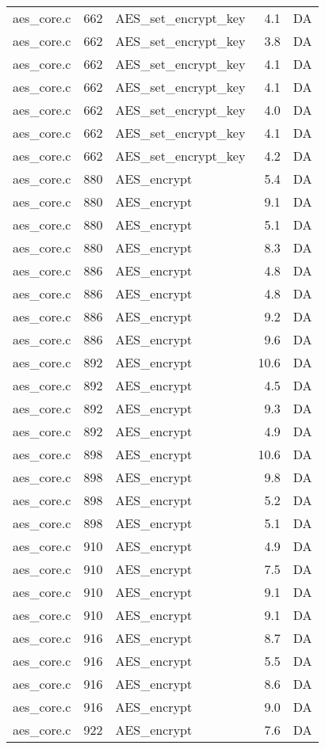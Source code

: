 \begin{table}[h!]
\begin{tabular}{lrlrr}
aes\_core.c& 662&AES\_set\_encrypt\_key&4.1 &DA\\
aes\_core.c& 662&AES\_set\_encrypt\_key&3.8 &DA\\
aes\_core.c& 662&AES\_set\_encrypt\_key&4.1 &DA\\
aes\_core.c& 662&AES\_set\_encrypt\_key&4.1 &DA\\
aes\_core.c& 662&AES\_set\_encrypt\_key&4.0 &DA\\
aes\_core.c& 662&AES\_set\_encrypt\_key&4.1 &DA\\
aes\_core.c& 662&AES\_set\_encrypt\_key&4.2 &DA\\
aes\_core.c& 880&AES\_encrypt&5.4 &DA\\
aes\_core.c& 880&AES\_encrypt&9.1 &DA\\
aes\_core.c& 880&AES\_encrypt&5.1 &DA\\
aes\_core.c& 880&AES\_encrypt&8.3 &DA\\
aes\_core.c& 886&AES\_encrypt&4.8 &DA\\
aes\_core.c& 886&AES\_encrypt&4.8 &DA\\
aes\_core.c& 886&AES\_encrypt&9.2 &DA\\
aes\_core.c& 886&AES\_encrypt&9.6 &DA\\
aes\_core.c& 892&AES\_encrypt&10.6 &DA\\
aes\_core.c& 892&AES\_encrypt&4.5 &DA\\
aes\_core.c& 892&AES\_encrypt&9.3 &DA\\
aes\_core.c& 892&AES\_encrypt&4.9 &DA\\
aes\_core.c& 898&AES\_encrypt&10.6 &DA\\
aes\_core.c& 898&AES\_encrypt&9.8 &DA\\
aes\_core.c& 898&AES\_encrypt&5.2 &DA\\
aes\_core.c& 898&AES\_encrypt&5.1 &DA\\
aes\_core.c& 910&AES\_encrypt&4.9 &DA\\
aes\_core.c& 910&AES\_encrypt&7.5 &DA\\
aes\_core.c& 910&AES\_encrypt&9.1 &DA\\
aes\_core.c& 910&AES\_encrypt&9.1 &DA\\
aes\_core.c& 916&AES\_encrypt&8.7 &DA\\
aes\_core.c& 916&AES\_encrypt&5.5 &DA\\
aes\_core.c& 916&AES\_encrypt&8.6 &DA\\
aes\_core.c& 916&AES\_encrypt&9.0 &DA\\
aes\_core.c& 922&AES\_encrypt&7.6 &DA\\

\end{tabular}
\end{table}
